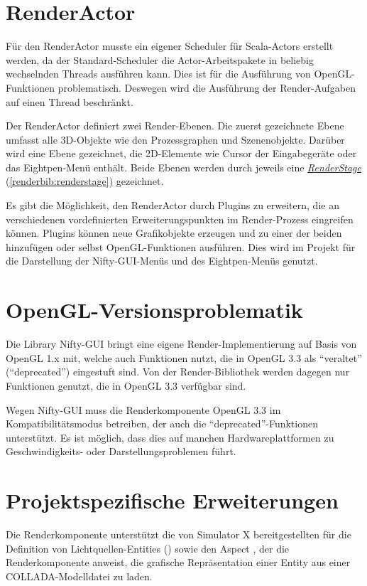 \documentclass[a4paper,10pt]{sphinxmanual}
\begin{document}
\section{RenderActor}
\label{renderkomponente:renderactor}
Für den RenderActor musste ein eigener Scheduler für Scala-Actors erstellt werden, da der Standard-Scheduler die Actor-Arbeitspakete in beliebig wechselnden Threads ausführen kann.
Dies ist für die Ausführung von OpenGL-Funktionen problematisch. Deswegen wird die Ausführung der Render-Aufgaben auf einen Thread beschränkt.

Der RenderActor definiert zwei Render-Ebenen. Die zuerst gezeichnete Ebene umfasst alle 3D-Objekte wie den Prozessgraphen und Szenenobjekte.
Darüber wird eine Ebene gezeichnet, die 2D-Elemente wie Cursor der Eingabegeräte oder das Eightpen-Menü \cite{buchi} enthält.
Beide Ebenen werden durch jeweils eine {\hyperref[renderbib:renderstage]{\emph{RenderStage}}} (\autoref*{renderbib:renderstage}) gezeichnet.

Es gibt die Möglichkeit, den RenderActor durch Plugins zu erweitern, die an verschiedenen vordefinierten Erweiterungspunkten im Render-Prozess eingreifen können.
Plugins können neue Grafikobjekte erzeugen und zu einer der beiden  hinzufügen oder selbst OpenGL-Funktionen ausführen.
Dies wird im Projekt für die Darstellung der Nifty-GUI-Menüs \cite{uli} und des Eightpen-Menüs \cite{buchi} genutzt.


\section{OpenGL-Versionsproblematik}
\label{renderkomponente:opengl-versionsproblematik}
Die Library Nifty-GUI bringt eine eigene Render-Implementierung auf Basis von OpenGL 1.x mit, welche auch Funktionen nutzt, die in OpenGL 3.3 als "`veraltet"' ("`deprecated"') eingestuft sind.
Von der Render-Bibliothek werden dagegen nur Funktionen genutzt, die in OpenGL 3.3 verfügbar sind.

Wegen Nifty-GUI muss die Renderkomponente OpenGL 3.3 im Kompatibilitätsmodus betreiben, der auch die "`deprecated"'-Funktionen unterstützt.
Es ist möglich, dass dies auf manchen Hardwareplattformen zu Geschwindigkeits- oder Darstellungsproblemen führt.


\section{Projektspezifische Erweiterungen}
\label{renderkomponente:projektspezifische-erweiterungen}
Die Renderkomponente unterstützt die von Simulator X bereitgestellten  für die Definition von Lichtquellen-Entities () sowie den Aspect , der die Renderkomponente anweist, die grafische Repräsentation einer Entity aus einer COLLADA-Modelldatei zu laden.
\end{document}
